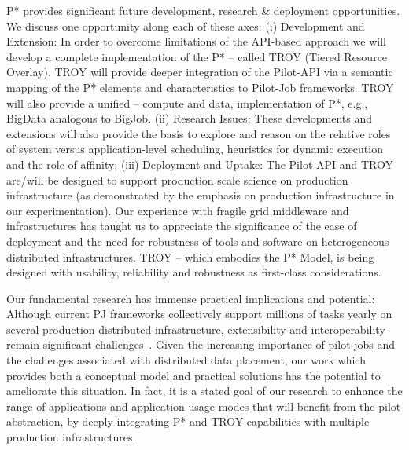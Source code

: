 \documentclass[conference,final]{IEEEtran}
\newcommand{\pilotjob}{Pilot-Job\xspace}
\begin{document}
P* provides significant future development, research \& deployment
opportunities. We discuss one opportunity along each of these axes:
(i) Development and Extension: In order to overcome limitations of the
API-based approach we will develop a complete implementation of the P*
-- called TROY (Tiered Resource Overlay). TROY will provide deeper
integration of the Pilot-API via a semantic mapping of the P* elements
and characteristics to \pilotjob frameworks.  TROY will also provide a
unified -- compute and data, implementation of P*, e.g., BigData
analogous to BigJob.  (ii) Research Issues: These developments and
extensions will also provide the basis to explore and reason on the
relative roles of system versus application-level scheduling,
heuristics for dynamic execution and the role of affinity; (iii)
Deployment and Uptake: The Pilot-API and TROY are/will be designed to
support production scale science on production infrastructure (as
demonstrated by the emphasis on production infrastructure in our
experimentation).  Our experience with fragile grid middleware and
infrastructures has taught us to appreciate the significance of the
ease of deployment and the need for robustness of tools and software
on heterogeneous distributed infrastructures.  TROY -- which embodies
the P* Model, is being designed with usability, reliability and
robustness as first-class considerations.

Our fundamental research has immense practical implications and
potential: Although current PJ frameworks collectively support
millions of tasks yearly on several production distributed
infrastructure, extensibility and interoperability remain significant
challenges~\cite{extenci}.  Given the increasing importance of
pilot-jobs and the challenges associated with distributed data
placement, our work which provides both a conceptual model and
practical solutions has the potential to ameliorate this situation.
In fact, it is a stated goal of our research to enhance the range of
applications and application usage-modes that will benefit from the
pilot abstraction, by deeply integrating P* and TROY capabilities with
multiple production infrastructures.






\end{document}
